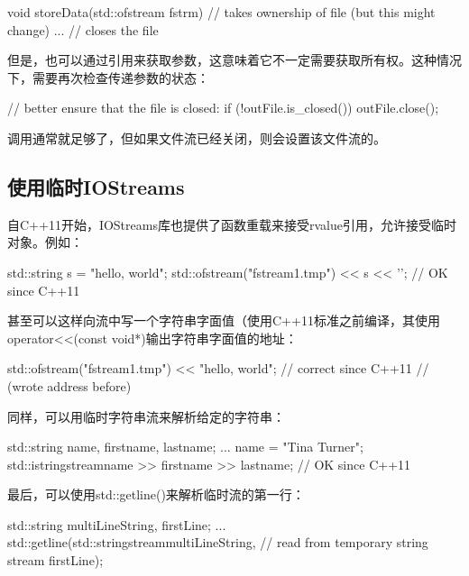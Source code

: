 \begin{cppcode}
void storeData(std::ofstream fstrm) // takes ownership of file (but this might change)
{
	...
} // closes the file
\end{cppcode}

但是，也可以通过引用来获取参数，这意味着它不一定需要获取所有权。这种情况下，需要再次检查传递参数的状态：

\begin{cppcode}
// better ensure that the file is closed:
if (!outFile.is_closed()) {
	outFile.close();
}
\end{cppcode}

调用通常就足够了，但如果文件流已经关闭，则会设置该文件流的。

\subsection{使用临时IOStreams}

自C++11开始，IOStreams库也提供了函数重载来接受rvalue引用，允许接受临时对象。例如：

\begin{cppcode}
std::string s = "hello, world";
std::ofstream("fstream1.tmp") << s << '\n'; // OK since C++11
\end{cppcode}

甚至可以这样向流中写一个字符串字面值（使用C++11标准之前编译，其使用operator<<(const void*)输出字符串字面值的地址：

\begin{cppcode}
std::ofstream("fstream1.tmp") << "hello, world\n"; // correct since C++11
// (wrote address before)
\end{cppcode}

同样，可以用临时字符串流来解析给定的字符串：

\begin{cppcode}
std::string name, firstname, lastname;
...
name = "Tina Turner";
std::istringstream{name} >> firstname >> lastname; // OK since C++11
\end{cppcode}

最后，可以使用std::getline()来解析临时流的第一行：

\begin{cppcode}
std::string multiLineString, firstLine;
...
std::getline(std::stringstream{multiLineString}, // read from temporary string stream
firstLine);
\end{cppcode}



























